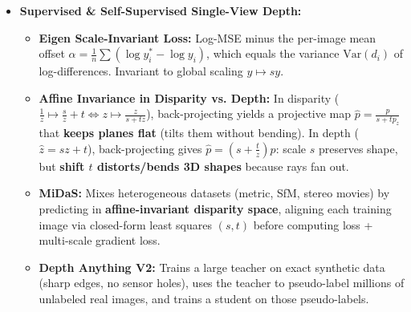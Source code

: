 \documentclass[10pt, a4paper]{article}
\begin{document}
\begin{itemize}
\begin{itemize}
        \item \textbf{Vanishing Points:} $\lambda v = K R d$ (depends only on rotation/pitch/roll, independent of translation).
        \item \textbf{Apparent Size:} $z = \frac{fH}{h}$ (requires knowing real object height $H$).
        \item \textbf{Vertical Ground Contact Position:} $z = \frac{fY}{y_s - y_h}$ (requires flat ground, camera height $Y$, and horizon row $y_h$; error grows as $z^2$).
        \item \textbf{What Networks Actually Use (Probes):}
        1) \emph{Pasted-Car Experiment:} Networks rely on \textbf{vertical image position} over apparent size.
        2) \emph{Pitch/Roll Crops:} Networks read raw pixel row rather than true distance to the horizon.
        3) \emph{Camera Focal Length Bias:} Networks memorize training focal length $f_0$, predicting $\hat{z} = \frac{f_0}{f}z$ on test camera $f$.
        4) \emph{Anamorphic Street Art:} Flat pavement painted like a hole fools single-image networks with zero uncertainty warning.
    \end{itemize}
    \item \textbf{Supervised \& Self-Supervised Single-View Depth:}
    \begin{itemize}
        \item \textbf{Eigen Scale-Invariant Loss:} Log-MSE minus the per-image mean offset $\alpha = \frac{1}{n}\sum (\log y_i^* - \log y_i)$, which equals the variance $\text{Var}(d_i)$ of log-differences. Invariant to global scaling $y \mapsto sy$.
        \item \textbf{Affine Invariance in Disparity vs. Depth:}
        In disparity ($\frac{1}{z} \mapsto \frac{s}{z} + t \iff z \mapsto \frac{z}{s+tz}$), back-projecting yields a projective map $\hat{p} = \frac{p}{s+tp_z}$ that \textbf{keeps planes flat} (tilts them without bending).
        In depth ($\hat{z} = sz+t$), back-projecting gives $\hat{p} = (s + \frac{t}{z})p$: scale $s$ preserves shape, but \textbf{shift $t$ distorts/bends 3D shapes} because rays fan out.
        \item \textbf{MiDaS:} Mixes heterogeneous datasets (metric, SfM, stereo movies) by predicting in \textbf{affine-invariant disparity space}, aligning each training image via closed-form least squares $(s,t)$ before computing loss + multi-scale gradient loss.
        \item \textbf{Depth Anything V2:} Trains a large teacher on exact synthetic data (sharp edges, no sensor holes), uses the teacher to pseudo-label millions of unlabeled real images, and trains a student on those pseudo-labels.

\end{itemize}
\end{itemize}
\end{document}
